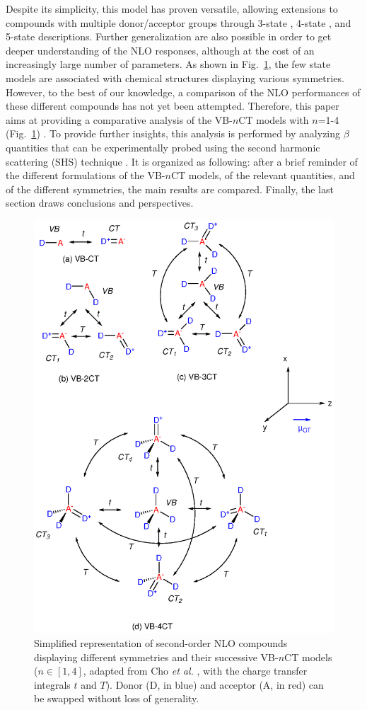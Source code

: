 \documentclass[USenglish]{article}
\begin{document}
Despite its simplicity, this model has proven versatile, allowing extensions to compounds with multiple donor/acceptor groups through 3-state \cite{hahnNonlinearOpticalProperties1999,barzoukasMolecularEngineeringPush2000,yangLargeOffDiagonalContribution2003}, 4-state \cite{choElementaryDescriptionNonlinear1998}, and 5-state \cite{choNonlinearOpticalProperties2002} descriptions. 
Further generalization are also possible \cite{alamGeneralizedFewstateModel2020} in order to get deeper understanding of the NLO responses, although at the cost of an increasingly large number of parameters.
As shown in Fig.~\ref{sc:mct}, the few state models are associated with chemical structures displaying various symmetries.
However, to the best of our knowledge, a comparison of the NLO performances of these different compounds has not yet been attempted. Therefore, this paper aims at providing a comparative analysis of the  VB-$n$CT models with $n$=1-4  (Fig.~\ref{sc:mct}) .  To provide further insights, this analysis is performed  by analyzing $\beta$ quantities that can be experimentally probed using the second harmonic scattering (SHS) technique \cite{verbiestSecondOrderNonlinearOptical2009,baumeierDensityfunctionalBasedDetermination2010,zhangTheoreticalInvestigationFirst2013,sistoInitioNonadiabaticDynamics2014,dellaiDynamicEffectsNonlinear2024}.
It is organized as following: after a brief reminder of the different formulations of the VB-$n$CT models, of the relevant quantities, and of the different symmetries, the main results are compared. Finally, the last section draws conclusions and perspectives.

\begin{figure}
	\includegraphics[width=.7\linewidth]{Figure2}
	\caption{Simplified representation of second-order NLO compounds displaying different symmetries and their successive VB-$n$CT models ($n\in[1,4]$, adapted from Cho \textit{et al.} \cite{choNonlinearOpticalProperties2002}, with the charge transfer integrals $t$ and $T$). Donor (D, in blue) and acceptor (A, in red) can be swapped without loss of generality.}
	\label{sc:mct}
\end{figure}
\end{document}
